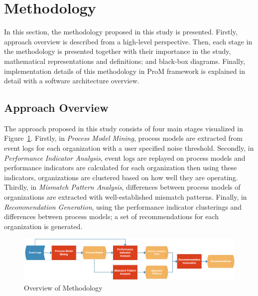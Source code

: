 \section{Methodology}
\label{sec:methodology}
In this section, the methodology proposed in this study is presented. Firstly, approach overview is described from a high-level perspective. Then, each stage in the methodology is presented together with their importance in the study, mathematical representations and definitions; and black-box diagrams. Finally, implementation details of this methodology in ProM framework is explained in detail with a software architecture overview.

\subsection{Approach Overview}
\label{subsec:approach-overview}
The approach proposed in this study consists of four main stages visualized in Figure~\ref{fig:approach-overview}. Firstly, in \textit{Process Model Mining}, process models are extracted from event logs for each organization with a user specified noise threshold. Secondly, in \textit{Performance Indicator Analysis}, event logs are replayed on process models and performance indicators are calculated for each organization then using these indicators, organizations are clustered based on how well they are operating. Thirdly, in \textit{Mismatch Pattern Analysis}, differences between process models of organizations are extracted with well-established mismatch patterns. Finally, in \textit{Recommendation Generation}, using the performance indicator clusterings and differences between process models; a set of recommendations for each organization is generated.
\begin{figure}
  \centering
  \includegraphics[width=\textwidth]{4_methodology/approach-overview}
  \caption{Overview of Methodology}
  \label{fig:approach-overview}
\end{figure}


